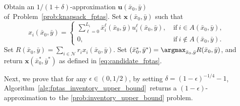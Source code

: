 \documentclass[mnsc,non-blindrev]{informs3}
\theoremstyle{definition}
\begin{document}
\begin{appendices}{\Large{}}
\begin{algorithm}[t]
\SingleSpacedXI
\caption{FPTAS for~the \ref{prob:inventory_upper_bound} problem}
\label{alg:fptas_inventory_upper_bound}
\begin{algorithmic}
\State Obtain an $1/(1+\delta)$-approximation $\bm{u}(\bar{x}_0,\bar{y})$ of~Problem~\eqref{prob:knapsack_fptas}.
\State Set $\bm{x}(\bar{x}_0,\bar{y})$ such that 
\begin{equation}\label{eq:candidate_fptas}
x_i(\bar{x}_0,\bar{y})=\begin{cases}\sum_{\ell=0}^{L_i}\bar{x}_i^{\ell}(\bar{x}_0,\bar{y})u_i^\ell(\bar{x}_0,\bar{y}),\ &\text{if}\ i\in A(\bar{x}_0,\bar{y}),\\
0,\ &\text{if}\ i\notin A(\bar{x}_0,\bar{y}).
\end{cases}
\end{equation}
\State Set $R(\bar{x}_0,\bar{y})=\sum_{i\in\mathcal{N}}r_ix_i(\bar{x}_0,\bar{y})$.
\EndFor
\State Set $(\bar{x}_0^*,\bar{y}^*)=\argmax_{\bar{x}_0,\bar{y}}R(\bar{x}_0,\bar{y})$, and return $\bm{x}(\bar{x}_0^*,\bar{y}^*)$ as defined in \eqref{eq:candidate_fptas}.
\end{algorithmic}
\end{algorithm}

Next, we prove that for any $\epsilon\in(0,1/2)$, by setting $\delta=(1-\epsilon)^{-1/4}-1$, Algorithm~\ref{alg:fptas_inventory_upper_bound}~returns a $(1-\epsilon)$-approximation to~the \ref{prob:inventory_upper_bound} problem.


\end{appendices}
\end{document}

